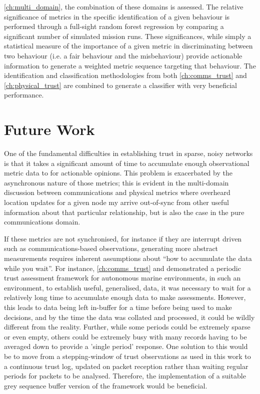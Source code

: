 \autoref{ch:multi_domain}, the combination of these domains is assessed.
The relative significance of metrics in the specific identification of a given behaviour is performed through a full-sight random forest regression by comparing a significant number of simulated mission runs.
These significances, while simply a statistical measure of the importance of a given metric in discriminating between two behaviour (i.e. a fair behaviour and the misbehaviour) provide actionable information to generate a weighted metric sequence targeting that behaviour.
The identification and classification methodologies from both \autoref{ch:comms_trust} and \autoref{ch:physical_trust} are combined to generate a classifier with very beneficial performance.




\section{Future Work}
One of the fundamental difficulties in establishing trust in sparse, noisy networks is that it takes a significant amount of time to accumulate enough observational metric data to for actionable opinions.
This problem is exacerbated by the asynchronous nature of those metrics; this is evident in the multi-domain discussion between communications and physical metrics where overheard location updates for a given node my arrive out-of-sync from other useful information about that particular relationship, but is also the case in the pure communications domain.

If these metrics are not synchronised, for instance if they are interrupt driven such as communications-based observations, generating more abstract measurements requires inherent assumptions about ``how to accumulate the data while you wait''. 
For instance, \autoref{ch:comms_trust} and \cite{Bolster2015} demonstrated a periodic trust assessment framework for autonomous marine environments, in such an environment, to establish useful, generalised, data, it was necessary to wait for a relatively long time to accumulate enough data to make assessments.
However, this leads to data being left in-buffer for a time before being used to make decisions, and by the time the data was collated and processed, it could be wildly different from the reality. 
Further, while some periods could be extremely sparse or even empty, others could be extremely busy with many records having to be averaged down to provide a 'single period' response. 
One solution to this would be to move from a stepping-window of trust observations as used in this work to a continuous trust log, updated on packet reception rather than waiting regular periods for packets to be analysed.
Therefore, the implementation of a suitable grey sequence buffer version of the framework would be beneficial.

